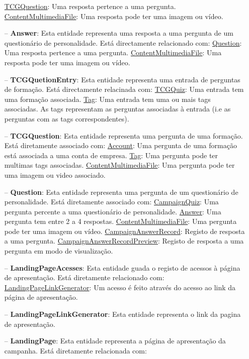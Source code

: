 \begin{itemize}
		\subitem \underline{TCGQuestion}: Uma resposta pertence a uma pergunta.
		\subitem \underline{ContentMultimediaFile}: Uma resposta pode ter uma imagem ou vídeo.
	\item[--] \textbf{Answer}: Esta entidade representa uma resposta a uma pergunta de um questionário de personalidade. Está directamente relacionado com:
		\subitem \underline{Question}: Uma resposta pertence a uma pergunta.
		\subitem \underline{ContentMultimediaFile}: Uma resposta pode ter uma imagem ou vídeo.
	\item[--] \textbf{TCGQuetionEntry}: Esta entidade representa uma entrada de perguntas de formação. Está directamente relacinada com:
		\subitem \underline{TCGQuiz}: Uma entrada tem uma formação associada.
		\subitem \underline{Tag}: Uma entrada tem uma ou mais tags associadas. As tags representam as perguntas associadas à entrada (i.e as perguntas com as tags correspondentes).
	\item[--] \textbf{TCGQuestion}: Esta entidade representa uma pergunta de uma formação. Está diretamente associado com:
		\subitem \underline{Account}: Uma pergunta de uma formação está associada a uma conta de empresa.
		\subitem \underline{Tag}: Uma pergunta pode ter multimas tags associadas.
		\subitem \underline{ContentMultimediaFile}: Uma pergunta pode ter uma imagem ou video associado.
	\item[--] \textbf{Question}: Esta entidade representa uma pergunta de um questionário de personalidade. Está diretamente associado com:
		\subitem \underline{CampaignQuiz}: Uma pergunta percente a uma questionário de personalidade.
		\subitem \underline{Answer}: Uma pergunta tem entre 2 a 4 respostas.
		\subitem \underline{ContentMultimediaFile}: Uma pergunta pode ter uma imagem ou vídeo.
		\subitem \underline{CampaignAnswerRecord}: Registo de resposta a uma pergunta.
		\subitem \underline{CampaignAnswerRecordPreview}: Registo de resposta a uma pergunta em modo de visualização.
	\item[--] \textbf{LandingPageAcesses}: Esta entidade guada o registo de acessos à página de apresentação. Está diretamente relacionado com:
		\subitem \underline{LandingPageLinkGenerator}: Um acesso é feito através do acesso ao link da página de apresentação.
	\item[--] \textbf{LandingPageLinkGenerator}: Esta entidade representa o link da pagina de apresentação. 
	\item[--] \textbf{LandingPage}: Esta entidade representa a página de apresentação da campanha. Está diretamente relacionada com:

\end{itemize}
